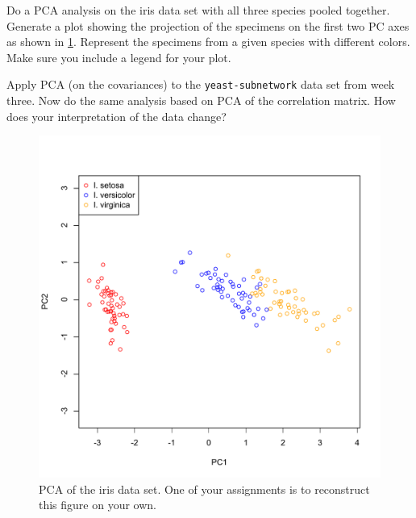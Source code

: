 \begin{assignment}
Do a PCA analysis on the iris data set with all
three species pooled together. Generate a plot showing the projection of
the specimens on the first two PC axes as shown in \cref{fig:pca}.
Represent the specimens from a given species with different colors. Make
sure you include a legend for your plot.

\medskip
Apply PCA (on the covariances) to the \lstinline!yeast-subnetwork! data
set from week three. Now do the same analysis based on PCA of the
correlation matrix. How does your interpretation of the data change?
\end{assignment}


\begin{figure}[htbp]
\centering
\includegraphics[width=0.5\columnwidth]{./figures/hands-on5/iris-all-pca.pdf}
\caption{PCA of the iris data set. One of your assignments is to
reconstruct this figure on your own.}\label{fig:pca}
\end{figure}


